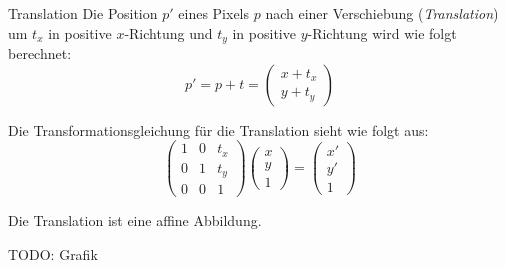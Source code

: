 \begin{defi}{Translation}
    Die Position $p'$ eines Pixels $p$ nach einer Verschiebung (\emph{Translation}) um $t_x$ in positive $x$-Richtung und $t_y$ in positive $y$-Richtung wird wie folgt berechnet:
    \[
        p' = p + t =
        \begin{pmatrix}
            x + t_x \\
            y + t_y
        \end{pmatrix}
    \]

    Die Transformationsgleichung für die Translation sieht wie folgt aus:
    \[
        \begin{pmatrix}
            1 & 0 & t_x \\
            0 & 1 & t_y \\
            0 & 0 & 1
        \end{pmatrix}
        \begin{pmatrix}
            x \\ y \\ 1
        \end{pmatrix}
        =
        \begin{pmatrix}
            x' \\ y' \\ 1
        \end{pmatrix}
    \]

    Die Translation ist eine affine Abbildung.

    TODO: Grafik
\end{defi}

